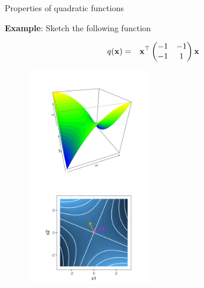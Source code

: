 \documentclass[11pt,compress,t,notes=noshow, xcolor=table]{beamer}
\begin{document}
  \begin{vbframe}{Properties of quadratic functions}
  
  \textbf{Example}: Sketch the following function
  
  \begin{eqnarray*}
    q(\xv) &=& \xv^\top \begin{pmatrix} -1 & -1 \\ -1 & 1\end{pmatrix} \xv %
  \end{eqnarray*}
  
    \vspace*{-1cm}
  
  \begin{figure}
    \includegraphics[width = 0.48\textwidth]{figure_man/quadratic_functions_2D_example_2_1.png} ~~ \includegraphics[width = 0.48\textwidth, keepaspectratio]{figure_man/quadratic_functions_2D_example_2_4.png}
  \end{figure}
  
  \end{vbframe}
  
  
  
  
  
\end{document}
